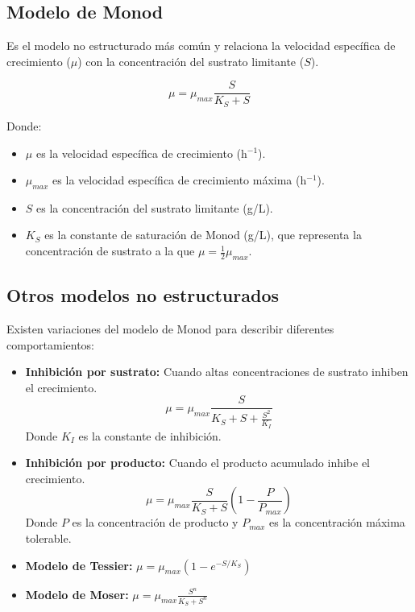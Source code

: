 \subsection{Modelo de Monod}

Es el modelo no estructurado más común y relaciona la velocidad específica de crecimiento ($\mu$) con la concentración del sustrato limitante ($S$).

\begin{equation}
    \mu = \mu_{max} \frac{S}{K_S + S}
    \label{eq:monod}
\end{equation}

Donde:
\begin{itemize}
    \item $\mu$ es la velocidad específica de crecimiento (h$^{-1}$).
    \item $\mu_{max}$ es la velocidad específica de crecimiento máxima (h$^{-1}$).
    \item $S$ es la concentración del sustrato limitante (g/L).
    \item $K_S$ es la constante de saturación de Monod (g/L), que representa la concentración de sustrato a la que $\mu = \frac{1}{2} \mu_{max}$.
\end{itemize}

\subsection{Otros modelos no estructurados}

Existen variaciones del modelo de Monod para describir diferentes comportamientos:

\begin{itemize}
    \item \textbf{Inhibición por sustrato:} Cuando altas concentraciones de sustrato inhiben el crecimiento.
    \begin{equation}
        \mu = \mu_{max} \frac{S}{K_S + S + \frac{S^2}{K_I}}
    \end{equation}
    Donde $K_I$ es la constante de inhibición.
    
    \item \textbf{Inhibición por producto:} Cuando el producto acumulado inhibe el crecimiento.
    \begin{equation}
        \mu = \mu_{max} \frac{S}{K_S + S} \left(1 - \frac{P}{P_{max}}\right)
    \end{equation}
    Donde $P$ es la concentración de producto y $P_{max}$ es la concentración máxima tolerable.
    
    \item \textbf{Modelo de Tessier:} $\mu = \mu_{max}(1 - e^{-S/K_S})$
    \item \textbf{Modelo de Moser:} $\mu = \mu_{max} \frac{S^n}{K_S + S^n}$
\end{itemize}

